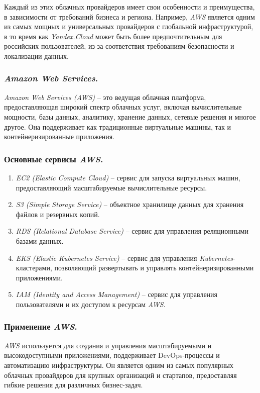 Каждый из этих облачных провайдеров имеет свои особенности и преимущества, в зависимости от требований бизнеса и региона. Например, \textit{AWS} является одним из самых мощных и универсальных провайдеров с глобальной инфраструктурой, в то время как \textit{Yandex.Cloud} может быть более предпочтительным для российских пользователей, из-за соответствия требованиям безопасности и локализации данных.

\subsubsection{\textit{Amazon Web Services}.}
\label{sec:aws}
\textit{Amazon Web Services (AWS)} -- это ведущая облачная платформа, предоставляющая широкий спектр облачных услуг, включая вычислительные мощности, базы данных, аналитику, хранение данных, сетевые решения и многое другое. Она поддерживает как традиционные виртуальные машины, так и контейнеризированные приложения.

\subsubsection{Основные сервисы \textit{AWS}.}
\begin{enumerate}
    \item \textit{EC2 (Elastic Compute Cloud)} -- сервис для запуска виртуальных машин, предоставляющий масштабируемые вычислительные ресурсы.
    \item \textit{S3 (Simple Storage Service)} -- объектное хранилище данных для хранения файлов и резервных копий.
    \item \textit{RDS (Relational Database Service)} -- сервис для управления реляционными базами данных.
    \item \textit{EKS (Elastic Kubernetes Service)} -- сервис для управления \textit{Kubernetes}-кластерами, позволяющий развертывать и управлять контейнеризированными приложениями.
    \item \textit{IAM (Identity and Access Management)} -- сервис для управления пользователями и их доступом к ресурсам \textit{AWS}.
\end{enumerate}

\subsubsection{Применение \textit{AWS}.}
\textit{AWS} используется для создания и управления масштабируемыми и высокодоступными приложениями, поддерживает DevOps-процессы и автоматизацию инфраструктуры. Он является одним из самых популярных облачных провайдеров для крупных организаций и стартапов, предоставляя гибкие решения для различных бизнес-задач.

